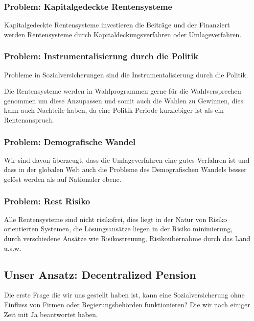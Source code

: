 \subsubsection*{Problem: Kapitalgedeckte Rentensysteme}

Kapitalgedeckte Rentensysteme investieren die Beiträge und der Finanziert werden Rentensysteme durch Kapitaldeckungsverfahren oder Umlageverfahren.


\subsubsection*{Problem: Instrumentalisierung durch die Politik}

Probleme in Sozialversicherungen sind die Instrumentalisierung durch die Politik.

Die Rentensysteme werden in Wahlprogrammen gerne für die Wahlversprechen genommen um diese Anzupassen und somit auch die Wahlen zu Gewinnen, dies kann auch Nachteile haben, da eine Politik-Periode kurzlebiger ist als ein Rentenanspruch.

\subsubsection*{Problem: Demografische Wandel}

Wir sind davon überzeugt, dass die Umlageverfahren eine gutes Verfahren ist und dass in der globalen Welt auch die Probleme des Demografischen Wandels besser gelöst werden als auf Nationaler ebene. 

\subsubsection*{Problem: Rest Risiko}

Alle Rentensysteme sind nicht risikofrei, dies liegt in der Natur von Risiko orientierten Systemen, die Lösungsansätze liegen in der Risiko minimierung, durch verschiedene Ansätze wie Risikostreuung, Risikoübernahme durch das Land u.s.w.


\subsection{Unser Ansatz: Decentralized Pension}

Die erste Frage die wir uns gestellt haben ist, kann eine Sozialversicherung ohne Einfluss von Firmen oder Regierungsbehörden funktionieren? Die wir nach einiger Zeit mit Ja beantwortet haben.

